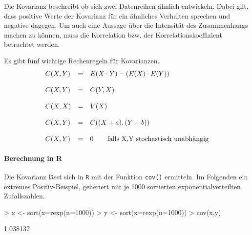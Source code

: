 Die \gls{Kovarianz} beschreibt ob sich zwei Datenreihen ähnlich 
entwickeln. Dabei gilt, dass positive Werte der Kovarianz für ein 
ähnliches Verhalten sprechen und negative dagegen. Um auch eine
Aussage über die Intensität des Zusammenhangs machen zu können,
muss die Korrelation bzw. der Korrelationskoeffizient betrachtet 
werden.

Es gibt fünf wichtige Rechenregeln für Kovarianzen.
\[ \begin{array}{l c l}
	C(X,Y) 
		& =
		& E(X \cdot Y) - (E(X) \cdot E(Y)) \\
	& & \\
	C(X,Y) 
		& =
		& C(Y,X) \\
	& & \\
	C(X,X) 
		& =
		& V(X) \\
	& & \\
	C(X,Y)
		& = 
		& C((X+a),(Y+b)) \\
	& & \\
	C(X,Y) 
		& =
		& 0 \qquad \text{falls } $X,Y$ \text{ stochastisch unabhängig} \\
\end{array} \]

\paragraph{Berechnung in R}
Die Kovarianz lässt sich in \lstinline{R} mit der Funktion 
\lstinline{cov()} ermitteln. Im Folgenden ein extremes 
Positiv-Beispiel, generiert mit je 1000 sortierten 
exponentialverteilten Zufallszahlen. 
\begin{Schunk}
\begin{Sinput}
> x <- sort(x=rexp(n=1000))
> y <- sort(x=rexp(n=1000))
> cov(x,y)
\end{Sinput}
\begin{Soutput}
[1] 1.038132
\end{Soutput}
\end{Schunk}

